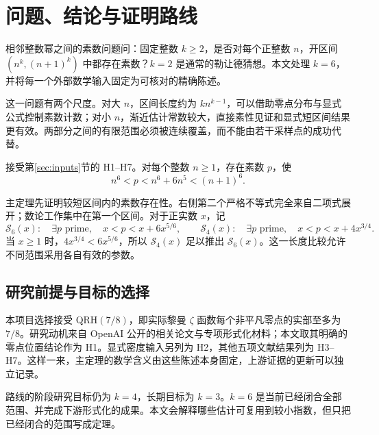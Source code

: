 \section{问题、结论与证明路线}\label{sec:introduction}

相邻整数幂之间的素数问题问：固定整数 $k\ge2$，是否对每个正整数 $n$，开区间 $(n^k,(n+1)^k)$ 中都存在素数？$k=2$ 是通常的勒让德猜想。本文处理 $k=6$，并将每一个外部数学输入固定为可核对的精确陈述。

这一问题有两个尺度。对大 $n$，区间长度约为 $kn^{k-1}$，可以借助零点分布与显式公式控制素数计数；对小 $n$，渐近估计常数较大，直接素性见证和显式短区间结果更有效。两部分之间的有限范围必须被连续覆盖，而不能由若干采样点的成功代替。

\begin{theorem}[主定理]\label{thm:main}
接受第\ref{sec:inputs}节的 H1--H7。对每个整数 $n\ge1$，存在素数 $p$，使
\begin{equation}\label{eq:main}
n^6<p<n^6+6n^5<(n+1)^6.
\end{equation}
\end{theorem}

主定理先证明较短区间内的素数存在性。右侧第二个严格不等式完全来自二项式展开；数论工作集中在第一个区间。对于正实数 $x$，记
\[
\mathcal S_6(x):\quad \exists p\text{ prime},\quad x<p<x+6x^{5/6},
\qquad
\mathcal S_4(x):\quad \exists p\text{ prime},\quad x<p<x+4x^{3/4}.
\]
当 $x\ge1$ 时，$4x^{3/4}<6x^{5/6}$，所以 $\mathcal S_4(x)$ 足以推出 $\mathcal S_6(x)$。这一长度比较允许不同范围采用各自有效的参数。

\subsection{研究前提与目标的选择}
本项目选择接受 QRH$(7/8)$，即实际黎曼 $\zeta$ 函数每个非平凡零点的实部至多为 $7/8$。研究动机来自 OpenAI 公开的相关论文与专项形式化材料\cite{OpenAIQRH}；本文取其明确的零点位置结论作为 H1。显式密度输入另列为 H2，其他五项文献结果列为 H3--H7。这样一来，主定理的数学含义由这些陈述本身固定，上游证据的更新可以独立记录。

路线的阶段研究目标仍为 $k=4$，长期目标为 $k=3$。$k=6$ 是当前已经闭合全部范围、并完成下游形式化的成果。本文会解释哪些估计可复用到较小指数，但只把已经闭合的范围写成定理。


